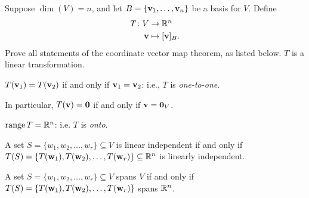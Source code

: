 \begin{samepage}
\ii Suppose $\dim(V)=n$, and let $B=\{{\mathbf v}_1,\dots ,{\mathbf v}_n\}$  be a basis for $V$. 
Define 
\begin{align*}
T\colon V&\rightarrow {\mathbb R}^n\\
{\mathbf v}&\mapsto [{\mathbf v}]_B.
\end{align*}
Prove all statements of the coordinate vector map theorem, as listed below. 
\bb
\ii  $T$ is a linear transformation. 

\ii $T({\mathbf v}_1)=T({\mathbf v}_2)$ if and only if ${\mathbf v}_1={\mathbf v}_2$: i.e., $T$ is {\em one-to-one}. 

In particular, $T({\mathbf v})={\mathbf 0}$ if and only if ${\mathbf v}={\mathbf 0}_V$. 

\ii  $\operatorname{range} T={\mathbb R}^n$: i.e. $T$ is {\em onto}. 

\ii  A set $S=\{w_1,w_2,\dots, w_r\}\subseteq V$ is linear independent  if and only if $T(S)=\{T({\mathbf w}_1), T({\mathbf w}_2),\dots, T({\mathbf w}_r)\}\subseteq {\mathbb R}^n$ is linearly independent. 

\ii A set $S=\{w_1,w_2,\dots, w_r\}\subseteq V$ spans $V$ if and only if $T(S)=\{T({\mathbf w}_1), T({\mathbf w}_2),\dots, T({\mathbf w}_r)\}$ spans ${\mathbb R}^n$. 
\ee
\end{samepage}
